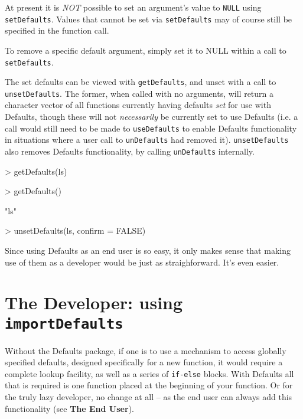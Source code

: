 \documentclass{article}
\begin{document}
\vspace{3mm}
\noindent
At present it is {\em NOT} possible to set an
argument's value to {\tt NULL} using {\tt setDefaults}.
Values that cannot be set via {\tt setDefaults} may
of course still be specified in the function call.

\vspace{3mm}
\noindent
To remove a specific default argument, simply set it to NULL
within a call to {\tt setDefaults}.

\vspace{3mm}
\noindent
The set defaults can be viewed with {\tt getDefaults}, and unset with
a call to {\tt unsetDefaults}.  The former, when called with no
arguments, will return a character vector of all functions currently
having defaults {\em set} for use with {\sf Defaults}, though these will
not {\em necessarily} be currently set to use Defaults (i.e. a call would
still need to be made to {\tt useDefaults} to enable Defaults functionality
in situations where a user call to {\tt unDefaults} had removed it).
{\tt unsetDefaults} also removes {\sf Defaults} functionality, by calling
{\tt unDefaults} internally.

\begin{Schunk}
\begin{Sinput}
> getDefaults(ls)
\end{Sinput}
\begin{Sinput}
> getDefaults()
\end{Sinput}
\begin{Soutput}
[1] "ls"
\end{Soutput}
\begin{Sinput}
> unsetDefaults(ls, confirm = FALSE)
\end{Sinput}
\end{Schunk}

\vspace{2mm}
\noindent
Since using Defaults as an end user is so easy,
it only makes sense that making use of them as a
developer would be just as straighforward. It's even easier.

\section{The Developer: using {\tt importDefaults}}
Without the {\sf Defaults} package, if one is to use
a mechanism to access globally specified defaults, designed
specifically for a new function, it would require
a complete lookup facility, as well as a series of {\tt if-else}
blocks.  With {\sf Defaults} all that is required is one function
placed at the beginning of your function. Or for the truly lazy
developer, no change at all -- as the end user can always add
this functionality (see {\bf The End User}).
\end{document}
